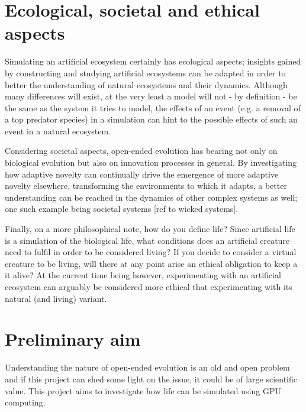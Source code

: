 \section{Ecological, societal and ethical aspects}
Simulating an artificial ecosystem certainly has ecological aspects; insights gained by constructing and studying artificial ecosystems can be adapted in order to better the understanding of natural ecosystems and their dynamics. Although many differences will exist, at the very least a model will not  - by definition - be the same as the system it tries to model, the effects of an event (e.g. a removal of a top predator species) in a simulation can hint to the possible effects of such an event in a natural ecosystem. 

Considering societal aspects, open-ended evolution has bearing not only on biological evolution but also on innovation processes in general. By investigating how adaptive novelty can continually drive the emergence of more adaptive novelty elsewhere, transforming the environments to which it adapts, a better understanding can be reached in the dynamics of other complex systems as well; one such example being societal systems [ref to wicked systems].

Finally, on a more philosophical note, how do you define life? Since artificial life is a simulation of the biological life, what conditions does an artificial creature need to fulfil in order to be considered living? If you decide to consider a virtual creature to be living, will there at any point arise an ethical obligation to keep a it alive? At the current time being however, experimenting with an artificial ecosystem can arguably be considered more ethical that experimenting with its natural (and living) variant.

\section{Preliminary aim}
Understanding the nature of open-ended evolution is an old and open problem and if this project can shed some light on the issue, it could be of large scientific value. This project aims to investigate how life can be simulated using GPU computing.

